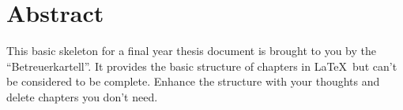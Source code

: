 \chapter*{Abstract}
\label{ch:abstract}

This basic skeleton for a final year thesis document is brought to you by the
``Betreuerkartell''. It provides the basic structure of chapters in \LaTeX~but
can't be considered to be complete. Enhance the structure with your
thoughts and delete chapters you don't need.


